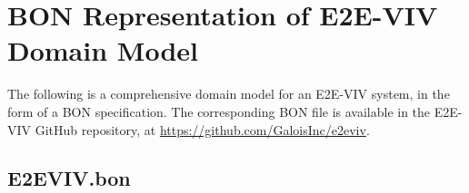 \chapter{BON Representation of E2E-VIV Domain Model}

The following is a comprehensive domain model for an E2E-VIV system,
in the form of a BON specification. The corresponding BON file is
available in the E2E-VIV GitHub repository, at
\url{https://github.com/GaloisInc/e2eviv}.

\section{E2EVIV.bon}

